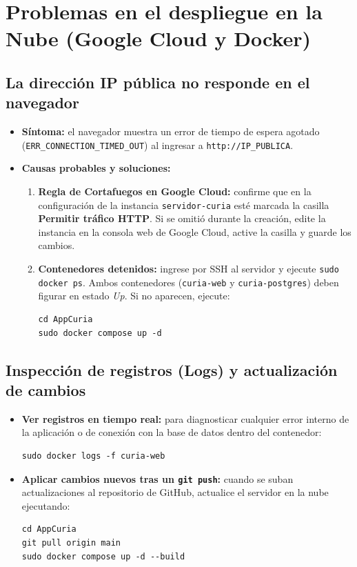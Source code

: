 \section{Problemas en el despliegue en la Nube (Google Cloud y Docker)}

\subsection{La dirección IP pública no responde en el navegador}
\begin{itemize}
    \item \textbf{Síntoma:} el navegador muestra un error de tiempo de espera agotado (\texttt{ERR\_CONNECTION\_TIMED\_OUT}) al ingresar a \texttt{http://IP\_PUBLICA}.
    \item \textbf{Causas probables y soluciones:}
    \begin{enumerate}
        \item \textbf{Regla de Cortafuegos en Google Cloud:} confirme que en la configuración de la instancia \texttt{servidor-curia} esté marcada la casilla \textbf{Permitir tráfico HTTP}. Si se omitió durante la creación, edite la instancia en la consola web de Google Cloud, active la casilla y guarde los cambios.
        \item \textbf{Contenedores detenidos:} ingrese por SSH al servidor y ejecute \texttt{sudo docker ps}. Ambos contenedores (\texttt{curia-web} y \texttt{curia-postgres}) deben figurar en estado \textit{Up}. Si no aparecen, ejecute:
        \begin{lstlisting}[style=consola]
cd AppCuria
sudo docker compose up -d
\end{lstlisting}
    \end{enumerate}
\end{itemize}

\subsection{Inspección de registros (Logs) y actualización de cambios}
\begin{itemize}
    \item \textbf{Ver registros en tiempo real:} para diagnosticar cualquier error interno de la aplicación o de conexión con la base de datos dentro del contenedor:
    \begin{lstlisting}[style=consola]
sudo docker logs -f curia-web
\end{lstlisting}
    \item \textbf{Aplicar cambios nuevos tras un \texttt{git push}:} cuando se suban actualizaciones al repositorio de GitHub, actualice el servidor en la nube ejecutando:
    \begin{lstlisting}[style=consola]
cd AppCuria
git pull origin main
sudo docker compose up -d --build
\end{lstlisting}
\end{itemize}

